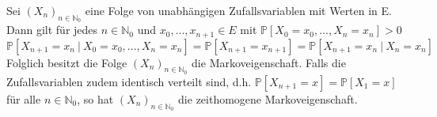 Sei $(X_{n})_{n \in \mathbb{N}_{0}}$ eine Folge von unabhängigen Zufallsvariablen mit Werten in E. Dann gilt für jedes $n \in \mathbb{N}_{0}$ und $x_{0},...,x_{n+1} \in E$ mit $\mathbb{P}[X_{0} = x_{0},...,X_{n} = x_{n}]>0$
\begin{equation*}
\mathbb{P}[X_{n+1} = x_{n} \: | \: X_{0} = x_{0},...,X_{n} = x_{n}] = \mathbb{P}[X_{n+1} = x_{n+1}] = \mathbb{P}[X_{n+1} = x_{n} \: | \: X_{n} = x_{n}]
\end{equation*}
Folglich besitzt die Folge $(X_{n})_{n \in \mathbb{N}_{0}}$ die Markoveigenschaft. Falls die Zufallsvariablen zudem identisch verteilt sind, d.h. $\mathbb{P}[X_{n+1} = x] = \mathbb{P}[X_{1} = x]$ für alle $n \in \mathbb{N}_{0}$, so hat $(X_{n})_{n \in \mathbb{N}_{0}}$ die zeithomogene Markoveigenschaft.
